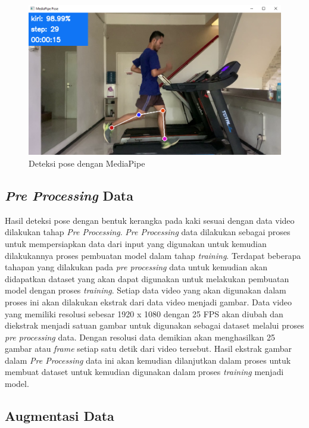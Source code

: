 \begin{figure}[H]
  \centering
  \includegraphics[scale=0.48]{gambar/deteksi pose.png}
  \caption{Deteksi pose dengan MediaPipe}
  \label{fig:DeteksiEstimasi}
\end{figure}

\subsection{\emph{Pre Processing} Data}
\label{subsec:PreProcessingData}

Hasil deteksi pose dengan bentuk kerangka pada kaki sesuai dengan data video dilakukan tahap \emph{Pre Processing}. \emph{Pre Processing} data dilakukan sebagai proses untuk mempersiapkan data dari input yang digunakan untuk kemudian dilakukannya proses pembuatan model dalam tahap \emph{training}. Terdapat beberapa tahapan yang dilakukan pada \emph{pre processing} data untuk kemudian akan didapatkan dataset yang akan dapat digunakan untuk melakukan pembuatan model dengan proses \emph{training}. Setiap data video yang akan digunakan dalam proses ini akan dilakukan ekstrak dari data video menjadi gambar. Data video yang memiliki resolusi sebesar 1920 x 1080 dengan 25 FPS akan diubah dan diekstrak menjadi satuan gambar untuk digunakan sebagai dataset melalui proses \emph{pre processing} data. Dengan resolusi data demikian akan menghasilkan 25 gambar atau \emph{frame} setiap satu detik dari video tersebut. Hasil ekstrak gambar dalam \emph{Pre Processing} data ini akan kemudian dilanjutkan dalam proses untuk membuat dataset untuk kemudian digunakan dalam proses \emph{training} menjadi model.

\subsection{Augmentasi Data}
\label{subsec:AugmentasiData}

